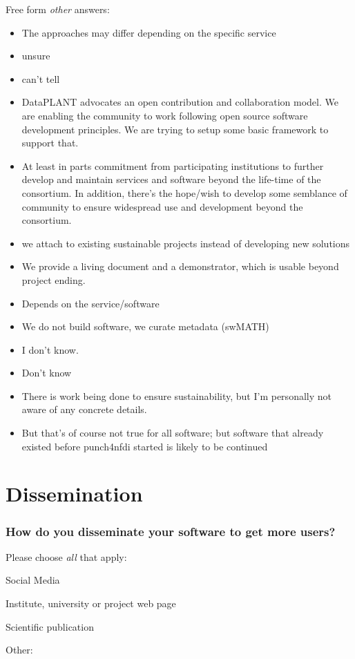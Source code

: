 \documentclass[headsepline,titlepage,twoside,12pt,toc=flat,headings=normal]{scrreprt}
\newcommand{\question}[1]{\subsubsection{#1}}
\newcommand{\otherbox}{\fbox{\phantom{This is how big an answer would be.}}}
\begin{document}
Free form \emph{other} answers:
\begin{itemize}
\item The approaches may differ depending on the specific service
\item unsure
\item can't tell
\item DataPLANT advocates an open contribution and collaboration model. We are enabling the community to work following open source software development principles. We are trying to setup some basic framework to support that.
\item At least in parts commitment from participating institutions to further develop and maintain services and software beyond the life-time of the consortium. In addition, there's the hope/wish to develop some semblance of community to ensure widespread use and development beyond the consortium.
\item we attach to existing sustainable projects instead of developing new solutions 
\item We provide a living document and a demonstrator, which is usable beyond project ending.
\item Depends on the service/software
\item We do not build software, we curate metadata (swMATH)
\item I don't know.
\item Don't know
\item There is work being done to ensure sustainability, but I'm personally not aware of any concrete details. 
\item But that's of course not true for all software; but software that already existed before punch4nfdi started is likely to be continued
\end{itemize}

\clearpage
\section{Dissemination}
\question{How do you disseminate your software to get more users?}\label{how-do-you-disseminate-your-software-to-get-more-users}
Please choose \emph{all} that apply:

\begin{answers}
\item Social Media
\item Institute, university or project web page
\item Scientific publication
\item Other: \otherbox
\end{answers}
\end{document}
